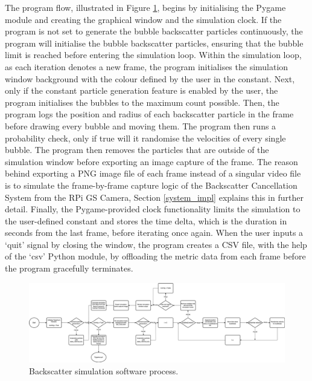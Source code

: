 The program flow, illustrated in Figure \ref{fig:simflow}, begins by initialising the Pygame module and creating the graphical window and the simulation clock. If the program is not set to generate the bubble backscatter particles continuously, the program will initialise the bubble backscatter particles, ensuring that the bubble limit is reached before entering the simulation loop. Within the simulation loop, as each iteration denotes a new frame, the program initialises the simulation window background with the colour defined by the user in the constant. Next, only if the constant particle generation feature is enabled by the user, the program initialises the bubbles to the maximum count possible. Then, the program logs the position and radius of each backscatter particle in the frame before drawing every bubble and moving them. The program then runs a probability check, only if true will it randomise the velocities of every single bubble. The program then removes the particles that are outside of the simulation window before exporting an image capture of the frame. The reason behind exporting a PNG image file of each frame instead of a singular video file is to simulate the frame-by-frame capture logic of the Backscatter Cancellation System from the RPi GS Camera, Section \ref{system_impl} explains this in further detail. Finally, the Pygame-provided clock functionality limits the simulation to the user-defined constant and stores the time delta, which is the duration in seconds from the last frame, before iterating once again. When the user inputs a `quit' signal by closing the window, the program creates a CSV file, with the help of the `csv' Python module, by offloading the metric data from each frame before the program gracefully terminates.

\pagebreak
\begin{landscape}
    \begin{figure}
        \centering
        \includegraphics[width=1\linewidth]{assets/impl-sim_flow.png}
        \caption{Backscatter simulation software process.}
        \label{fig:simflow}
    \end{figure}
\end{landscape}
\pagebreak

